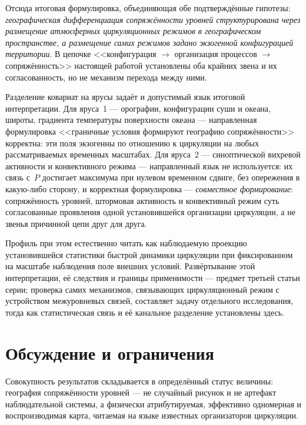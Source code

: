 \documentclass[11pt,a4paper]{article}
\begin{document}
Отсюда итоговая формулировка, объединяющая обе подтверждённые гипотезы: \emph{географическая дифференциация сопряжённости уровней структурирована через размещение атмосферных циркуляционных режимов в географическом пространстве, а размещение самих режимов задано экзогенной конфигурацией территории}. В цепочке <<конфигурация $\to$ организация процессов $\to$ сопряжённость>> настоящей работой установлены оба крайних звена и их согласованность, но не механизм перехода между ними.

Разделение ковариат на ярусы задаёт и допустимый язык итоговой интерпретации. Для яруса~1 --- орографии, конфигурации суши и океана, широты, градиента температуры поверхности океана --- направленная формулировка <<граничные условия формируют географию сопряжённости>> корректна: эти поля экзогенны по отношению к циркуляции на любых рассматриваемых временных масштабах. Для яруса~2 --- синоптической вихревой активности и конвективного режима --- направленный язык не используется: их связь с~$P$ достигает максимума при нулевом временном сдвиге, без опережения в какую-либо сторону, и корректная формулировка --- \emph{совместное формирование}: сопряжённость уровней, штормовая активность и конвективный режим суть согласованные проявления одной установившейся организации циркуляции, а не звенья причинной цепи друг для друга.

Профиль при этом естественно читать как наблюдаемую проекцию установившейся статистики быстрой динамики циркуляции при фиксированном на масштабе наблюдения поле внешних условий. Развёртывание этой интерпретации, её следствия и границы применимости --- предмет третьей статьи серии; проверка самих механизмов, связывающих циркуляционный режим с устройством межуровневых связей, составляет задачу отдельного исследования, тогда как статистическая связь и её канальное разделение установлены здесь.

\section{Обсуждение и ограничения}
\label{sec:limitations}

Совокупность результатов складывается в определённый статус величины: география сопряжённости уровней --- не случайный рисунок и не артефакт наблюдательной системы, а физически атрибутируемая, эффективно одномерная и воспроизводимая карта, читаемая на языке известных организаторов циркуляции.
\end{document}
